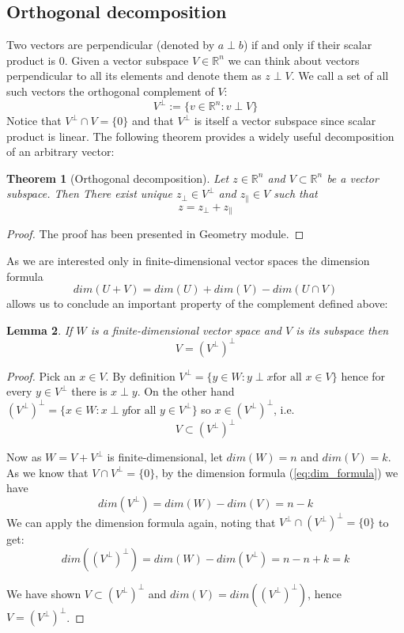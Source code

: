 \documentclass[a4paper]{article}
\theoremstyle{break}
\newtheorem{theorem}{Theorem}[section]
\newtheorem{lemma}[theorem]{Lemma}
\newcommand{\R}{\mathbb{R}}
\newcommand{\pll}{\parallel}
\begin{document}
\subsection{Orthogonal decomposition}
Two vectors are perpendicular (denoted by $ a \perp b$) if and only if their scalar product is 0. Given a vector subspace $V \in \R^n$ we can think about vectors perpendicular to all its elements and denote them as $z \perp V$. We call a set of all such vectors the orthogonal complement of $V$:
$$ V^\perp := \{ v \in \R^n : v \perp V\} $$
Notice that $V^\perp \cap V = \{0\}$ and that $V^\perp$ is itself a vector subspace since scalar product is linear. The following theorem provides a widely useful decomposition of an arbitrary vector:

\begin{theorem}[Orthogonal decomposition] \label{thm:projection}
    Let $z \in \R^n$ and $V \subset \R^n$ be a vector subspace. Then
    There exist unique $z_\perp \in V^\perp$ and $z_\pll \in V$ such that  
    \begin{equation}
        z = z_\perp + z_\pll
    \end{equation}
\end{theorem}

\begin{proof}
    The proof has been presented in Geometry module.
\end{proof}

As we are interested only in finite-dimensional vector spaces the dimension formula
\begin{equation}\label{eq:dim_formula}
    dim(U + V) = dim(U) + dim(V) - dim( U \cap V)
\end{equation}
allows us to conclude an important property of the complement defined above:

\begin{lemma}\label{lem:double_perp}
    If $W$ is a finite-dimensional vector space and $V$ is its subspace then
    $$ V = (V^\perp)^\perp $$
\end{lemma}

\begin{proof}
    Pick an $x \in V$. By definition $ V^\perp = \{ y \in W : y \perp x \text{for all } x \in V \}$ hence for every $y \in V^\perp $ there is $x \perp y$. On the other hand $ (V^\perp)^\perp = \{ x \in W : x \perp y \text{for all } y \in V^\perp \}$ so $x \in (V^\perp)^\perp$, i.e.
    $$ V \subset (V^\perp)^\perp$$

    Now as $W = V + V^\perp$ is finite-dimensional, let $dim(W) = n$ and $dim(V) = k$. 
    As we know that $V \cap V^\perp = \{0\}$, by the dimension formula (\ref{eq:dim_formula}) we have
    $$ dim(V^\perp) = dim(W) - dim(V) = n - k $$
    We can apply the dimension formula again, noting that $ V^\perp \cap (V^\perp)^\perp = \{0\} $ to get:
    $$ dim((V^\perp)^\perp) = dim(W) - dim(V^\perp) = n - n + k = k $$

    We have shown $ V \subset (V^\perp)^\perp$ and $ dim(V) = dim((V^\perp)^\perp)$,
    hence $ V = (V^\perp)^\perp$.
\end{proof}
\end{document}
